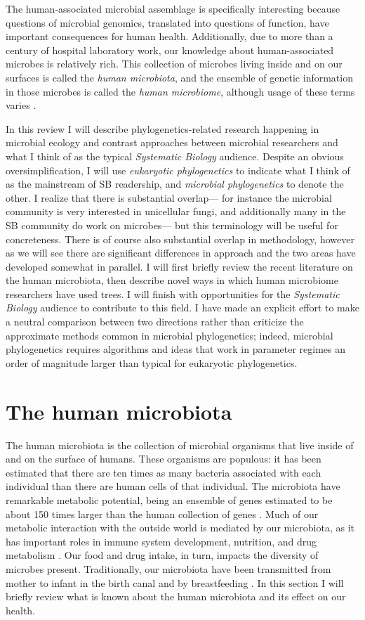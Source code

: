 \documentclass{amsart}
\begin{document}
The human-associated microbial assemblage is specifically interesting because questions of microbial genomics, translated into questions of function, have important consequences for human health.
Additionally, due to more than a century of hospital laboratory work, our knowledge about human-associated microbes is relatively rich.
This collection of microbes living inside and on our surfaces is called the \textit{human microbiota}, and the ensemble of genetic information in those microbes is called the \textit{human microbiome}, although usage of these terms varies \citep{Boon2013-mc}.

In this review I will describe phylogenetics-related research happening in microbial ecology and contrast approaches between microbial researchers and what I think of as the typical \emph{Systematic Biology} audience.
Despite an obvious oversimplification, I will use \textit{eukaryotic phylogenetics} to indicate what I think of as the mainstream of SB readership, and \textit{microbial phylogenetics} to denote the other.
I realize that there is substantial overlap--- for instance the microbial community is very interested in unicellular fungi, and additionally many in the SB community do work on microbes--- but this terminology will be useful for concreteness.
There is of course also substantial overlap in methodology, however as we will see there are significant differences in approach and the two areas have developed somewhat in parallel.
I will first briefly review the recent literature on the human microbiota, then describe novel ways in which human microbiome researchers have used trees.
I will finish with opportunities for the \textit{Systematic Biology} audience to contribute to this field.
I have made an explicit effort to make a neutral comparison between two directions rather than criticize the approximate methods common in microbial phylogenetics; indeed, microbial phylogenetics requires algorithms and ideas that work in parameter regimes an order of magnitude larger than typical for eukaryotic phylogenetics.

\section{The human microbiota}
The human microbiota is the collection of microbial organisms that live inside of and on the surface of humans.
These organisms are populous: it has been estimated that there are ten times as many bacteria associated with each individual than there are human cells of that individual.
The microbiota have remarkable metabolic potential, being an ensemble of genes estimated to be about 150 times larger than the human collection of genes \citep{qin2010human}.
Much of our metabolic interaction with the outside world is mediated by our microbiota, as it has important roles in immune system development, nutrition, and drug metabolism \citep{kau2011human,maurice2013xenobiotics}.
Our food and drug intake, in turn, impacts the diversity of microbes present.
Traditionally, our microbiota have been transmitted from mother to infant in the birth canal and by breastfeeding \citep[reviewed in][]{funkhouser2013mom}.
In this section I will briefly review what is known about the human microbiota and its effect on our health.
\end{document}
